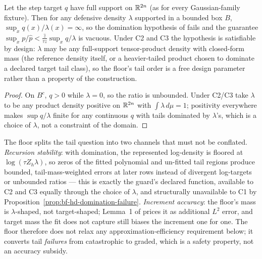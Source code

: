 \begin{proposition}
\label{prop:bf-hd-domination-failure}
Let the step target \(q\) have full support on \(\mathbb{R}^{2n}\) (as for every
Gaussian-family fixture).  Then for any defensive density \(\lambda\)
supported in a bounded box \(B\), \(\sup_x q(x)/\lambda(x)=\infty\), so
the domination hypothesis of \citet[eq.~(13)]{zhao2024ttsequential}
fails and the guarantee
\(\sup_x p/\hat p<\tfrac{\hat z}{\tau z}\sup_x q/\lambda\) is vacuous.
Under C2 and C3 the hypothesis is satisfiable by design: \(\lambda\) may
be any full-support tensor-product density with closed-form mass
(the reference density itself, or a heavier-tailed product chosen to
dominate a declared target tail class), so the floor's tail order is a
free design parameter rather than a property of the construction.
\end{proposition}

\begin{proof}
On \(B^{c}\), \(q>0\) while \(\lambda=0\), so the ratio is unbounded.
Under C2/C3 take \(\lambda\) to be any product density positive on
\(\mathbb{R}^{2n}\) with \(\int\lambda\,d\mu=1\); positivity everywhere makes
\(\sup q/\lambda\) finite for any continuous \(q\) with tails dominated
by \(\lambda\)'s, which is a choice of \(\lambda\), not a constraint of
the domain.
\end{proof}

\begin{remark}
\label{rem:bf-hd-floor-channels}
The floor splits the tail question into two channels that must not be
conflated.  \emph{Recursion stability}: with domination, the represented
log-density is floored at \(\log(\tau Z_h\lambda)\), so zeros of the
fitted polynomial and un-fitted tail regions produce bounded,
tail-mass-weighted errors at later rows instead of divergent
log-targets or unbounded ratios --- this is exactly the guard's declared
function, available to C2 and C3 equally through the choice of
\(\lambda\), and structurally unavailable to C1 by
Proposition~\ref{prop:bf-hd-domination-failure}.
\emph{Increment accuracy}: the floor's mass is \(\lambda\)-shaped, not
target-shaped; Lemma~1 of \citet{zhao2024ttsequential} prices it as
additional \(L^2\) error, and target mass the fit does not capture still
biases the increment one for one.  The floor therefore does not relax
any approximation-efficiency requirement below; it converts tail
\emph{failures} from catastrophic to graded, which is a safety property,
not an accuracy subsidy.
\end{remark}

